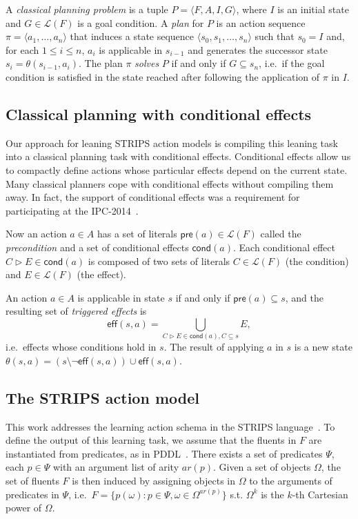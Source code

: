\documentclass[letterpaper]{article} %
\newcommand{\tup}[1]{{\langle #1 \rangle}}
\newcommand{\pre}{\mathsf{pre}}     %
\newcommand{\eff}{\mathsf{eff}}     %
\newcommand{\cond}{\mathsf{cond}}   %
\begin{document}
A {\em classical planning problem} is a tuple $P=\tup{F,A,I,G}$, where $I$ is an initial state and $G\in\mathcal{L}(F)$ is a goal condition. A {\em plan} for $P$ is an action sequence $\pi=\tup{a_1, \ldots, a_n}$ that induces a state sequence $\tup{s_0, s_1, \ldots, s_n}$ such that $s_0=I$ and, for each {\small $1\leq i\leq n$}, $a_i$ is applicable in $s_{i-1}$ and generates the successor state $s_i=\theta(s_{i-1},a_i)$. The plan $\pi$ {\em solves} $P$ if and only if $G\subseteq s_n$, i.e.~if the goal condition is satisfied in the state reached after following the application of $\pi$ in $I$.


\subsection{Classical planning with conditional effects}
Our approach for leaning STRIPS action models is compiling this leaning task into a classical planning task with conditional effects. Conditional effects allow us to compactly define actions whose particular effects depend on the current state. Many classical planners cope with conditional effects without compiling them away. In fact, the support of conditional effects was a requirement for participating at the IPC-2014~\cite{vallati:IPC:AIM2015}.

Now an action $a\in A$ has a set of literals $\pre(a)\in\mathcal{L}(F)$ called the {\em precondition} and a set of conditional effects $\cond(a)$. Each conditional effect $C\rhd E\in\cond(a)$ is composed of two sets of literals $C\in\mathcal{L}(F)$ (the condition) and $E\in\mathcal{L}(F)$ (the effect).

An action $a\in A$ is applicable in state $s$ if and only if $\pre(a)\subseteq s$, and the resulting set of {\em triggered effects} is
\[
\eff(s,a)=\bigcup_{C\rhd E\in\cond(a),C\subseteq s} E,
\]
i.e.~effects whose conditions hold in $s$. The result of applying $a$ in $s$ is a new state $\theta(s,a)=(s\setminus \neg \eff(s,a))\cup\eff(s,a)$.


\subsection{The STRIPS action model}
This work addresses the learning  action schema in  the  STRIPS language~\cite{fikes1971strips}. To define the output of this learning task, we assume that the fluents in $F$ are instantiated from predicates, as in PDDL~\cite{mcdermott1998pddl,fox2003pddl2}. There exists a set of predicates $\Psi$, each $p\in\Psi$ with an argument list of arity $ar(p)$. Given a set of objects $\Omega$, the set of fluents $F$ is then induced by assigning objects in $\Omega$ to the arguments of predicates in $\Psi$, i.e.~$F=\{p(\omega):p\in\Psi,\omega\in\Omega^{ar(p)}\}$ s.t. $\Omega^k$ is the $k$-th Cartesian power of $\Omega$.
\end{document}
